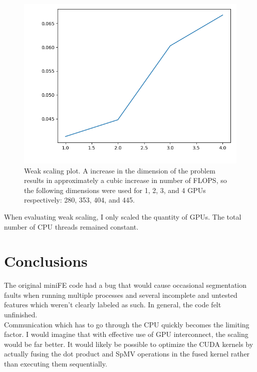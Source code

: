 \documentclass{article}
\begin{document}
\begin{figure}[h] 
  \centering
  \includegraphics[width=0.8\linewidth]{../weak_scaling.png}
  \caption{Weak scaling plot. A increase in the dimension of the problem
  results in approximately a cubic increase in number of FLOPS, so the
following dimensions were used for 1, 2, 3, and 4 GPUs respectively: 
280, 353, 404, and 445.}
\end{figure}

When evaluating weak scaling, I only scaled the quantity of GPUs. The total
number of CPU threads remained constant. \\

\section{Conclusions}

The original miniFE code had a bug that would cause occasional segmentation
faults when running multiple processes and several incomplete and untested
features which weren't clearly labeled as such. In general, the code felt
unfinished. \\

Communication which has to go through the CPU quickly becomes the limiting
factor. I would imagine that with effective use of GPU interconnect, the
scaling would be far better. It would likely be possible to optimize the CUDA
kernels by actually fusing the dot product and SpMV operations in the fused
kernel rather than executing them sequentially.
\end{document}
